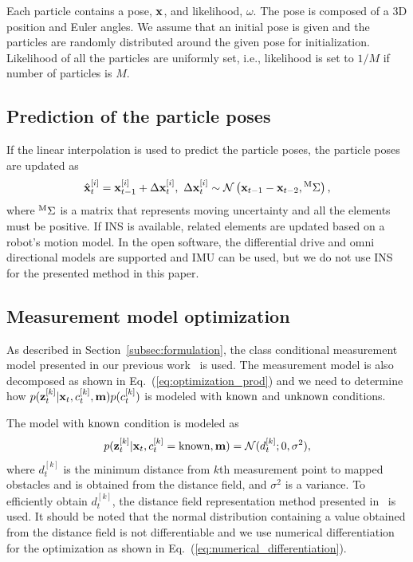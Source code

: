 \documentclass[letterpaper, 10 pt, conference]{ieeeconf}  %
\begin{document}
Each particle contains a pose, ${\bf x}$, and likelihood, $\omega$.
The pose is composed of a 3D position and Euler angles.
We assume that an initial pose is given and the particles are randomly distributed around the given pose for initialization.
Likelihood of all the particles are uniformly set, i.e., likelihood is set to $1 / M$ if number of particles is $M$.



\subsection{Prediction of the particle poses}

If the linear interpolation is used to predict the particle poses, the particle poses are updated as
%
\begin{align}
    \hat{{\bf x}}_{t}^{[i]} = {\bf x}_{t-1}^{[i]} + \Delta {\bf x}_{t}^{[i]}, ~
    \Delta {\bf x}_{t}^{[i]} \sim \mathcal{N} \left( {\bf x}_{t-1} - {\bf x}_{t-2}, {}^{\rm M}\Sigma \right),
    \label{eq:pose_prediction}
\end{align}
%
where ${}^{\rm M}\Sigma$ is a matrix that represents moving uncertainty and all the elements must be positive.
If INS is available, related elements are updated based on a robot's motion model.
In the open software, the differential drive and omni directional models are supported and IMU can be used, but we do not use INS for the presented method in this paper.



\subsection{Measurement model optimization}
\label{sec:measurement_model}

As described in Section~\ref{subsec:formulation}, the class conditional measurement model presented in our previous work~\cite{AkaiIROS2018} is used.
The measurement model is also decomposed as shown in Eq.~(\ref{eq:optimization_prod}) and we need to determine how $p({\bf z}_{t}^{[k]} | {\bf x}_{t}, c_{t}^{[k]}, {\bf m}) p(c_{t}^{[k]})$ is modeled with ${\rm known}$ and ${\rm unknown}$ conditions.

The model with ${\rm known}$ condition is modeled as
%
\begin{align}
    p({\bf z}_{t}^{[k]} | {\bf x}_{t}, c_{t}^{[k]} = {\rm known}, {\bf m}) = \mathcal{N}(d_{t}^{[k]}; 0, \sigma^{2}),
    \label{eq:known_measurement_model}
\end{align}
%
where $d_{t}^{[k]}$ is the minimum distance from $k$th measurement point to mapped obstacles and is obtained from the distance field, and $\sigma^{2}$ is a variance.
To efficiently obtain $d_{t}^{[k]}$, the distance field representation method presented in~\cite{AkaiIV2020} is used.
It should be noted that the normal distribution containing a value obtained from the distance field is not differentiable and we use numerical differentiation for the optimization as shown in Eq.~(\ref{eq:numerical_differentiation}).
\end{document}
